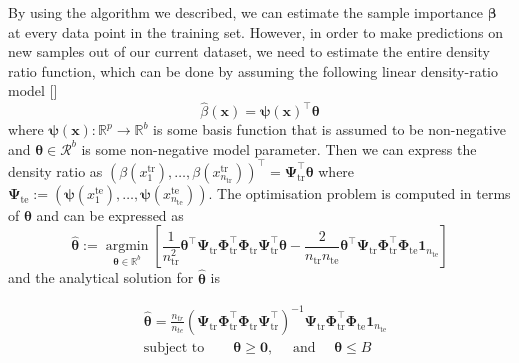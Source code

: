 \documentclass[a4paper,12pt]{article}
\begin{document}
By using the algorithm we described, we can estimate the sample importance $\boldsymbol{\beta}$ at every data point in the training set. However, in order to make predictions on new samples out of our current dataset, we need to estimate the entire density ratio function, which can be done by assuming the following linear density-ratio model [\cite{kanamori2009condition}]
\begin{equation*}
\hat{\beta}(\boldsymbol{x})=\boldsymbol{\psi}(\boldsymbol{x})^{\top} \boldsymbol{\theta}
\end{equation*}
where $\boldsymbol{\psi}(\boldsymbol{x}): \mathbb{R}^{p} \rightarrow \mathbb{R}^{b}$ is some basis function that is assumed to be non-negative and $\boldsymbol{\theta} \in \mathcal{R}^{b}$ is some non-negative model parameter. Then we can express the density ratio as $\left(\beta\left({x}_{1}^{\mathrm{tr}}\right), \ldots, \beta\left({x}_{n_{\mathrm{tr}}}^{\mathrm{tr}}\right)\right)^{\top}=\boldsymbol{\Psi}_{\mathrm{tr}}^{\top} \boldsymbol{\theta}$ where $\boldsymbol{\Psi}_{\mathrm{te}}:=\left(\boldsymbol{\psi}\left(x_{1}^{\mathrm{te}}\right), \ldots, \boldsymbol{\psi}\left(x_{n_{\mathrm{te}}}^{\mathrm{te}}\right)\right)$. The optimisation problem is computed in terms of $\boldsymbol{\theta}$ and can be expressed as 
\begin{equation*}
\widehat{\boldsymbol{\theta}}:=\underset{\boldsymbol{\theta} \in \mathbb{R}^{b}}{\operatorname{argmin}}\left[\frac{1}{n_{\mathrm{tr}}^{2}} \boldsymbol{\theta}^{\top} \boldsymbol{\Psi}_{\mathrm{tr}} \boldsymbol{\Phi}_{\mathrm{tr}}^{\top} \boldsymbol{\Phi}_{\mathrm{tr}} \boldsymbol{\Psi}_{\mathrm{tr}}^{\top} \boldsymbol{\theta}-\frac{2}{n_{\mathrm{tr}} n_{\mathrm{te}}} \boldsymbol{\theta}^{\top} \boldsymbol{\Psi}_{\mathrm{tr}} \boldsymbol{\Phi}_{\mathrm{tr}}^{\top} \boldsymbol{\Phi}_{\mathrm{te}} \mathbf{1}_{n_{\mathrm{te}}}\right]
\end{equation*}
and the analytical solution for $\widehat{\boldsymbol{\theta}}$ is 

\begin{align*}
& \widehat{\boldsymbol{\theta}} =\frac{n_{tr}}{n_{te}}\left(\boldsymbol{\Psi}_{\mathrm{tr}} \boldsymbol{\Phi}_{\mathrm{tr}}^{\top} \boldsymbol{\Phi}_{\mathrm{tr}} \boldsymbol{\Psi}_{\mathrm{tr}}^{\top}\right)^{-1} \boldsymbol{\Psi}_{\mathrm{tr}} \boldsymbol{\Phi}_{\mathrm{tr}}^{\top} \boldsymbol{\Phi}_{\mathrm{te}} \mathbf{1}_{n_{\mathrm{te}}} \\
& \text {subject to} \hspace{25pt} \boldsymbol{\theta} \geq \mathbf{0}, \quad \text { and } \quad \boldsymbol{\theta} \leq B
\end{align*}
\end{document}
